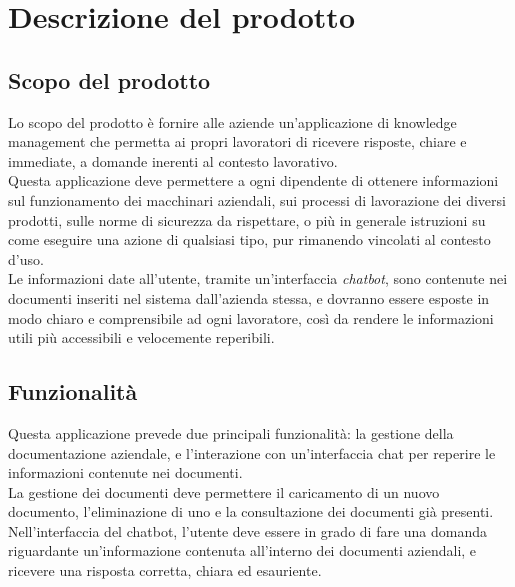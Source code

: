 \chapter{Descrizione del prodotto} \label{cap:descr}
\section{Scopo del prodotto}
Lo scopo del prodotto è fornire alle aziende un’applicazione di knowledge management che permetta ai propri lavoratori di ricevere risposte, chiare e immediate, a domande inerenti al contesto lavorativo.\\
Questa applicazione deve permettere a ogni dipendente di ottenere informazioni sul funzionamento dei macchinari aziendali, sui processi di lavorazione dei diversi prodotti, sulle norme di sicurezza da rispettare, o più in generale istruzioni su come eseguire una azione di qualsiasi tipo, pur rimanendo vincolati al contesto d’uso.\\
Le informazioni date all'utente, tramite un’interfaccia \textit{chatbot}, sono contenute nei documenti inseriti nel sistema dall’azienda stessa, e dovranno essere esposte in modo chiaro e comprensibile ad ogni lavoratore, così da rendere le informazioni utili più accessibili e velocemente reperibili.


\section{Funzionalità}
Questa applicazione prevede due principali funzionalità: la gestione della documentazione aziendale, e l’interazione con un’interfaccia chat per reperire le informazioni contenute nei documenti.\\
La gestione dei documenti deve permettere il caricamento di un nuovo documento, l’eliminazione di uno e la consultazione dei documenti già presenti.\\
Nell’interfaccia del chatbot, l’utente deve essere in grado di fare una domanda riguardante un’informazione contenuta all’interno dei documenti aziendali, e ricevere una risposta corretta, chiara ed esauriente.


